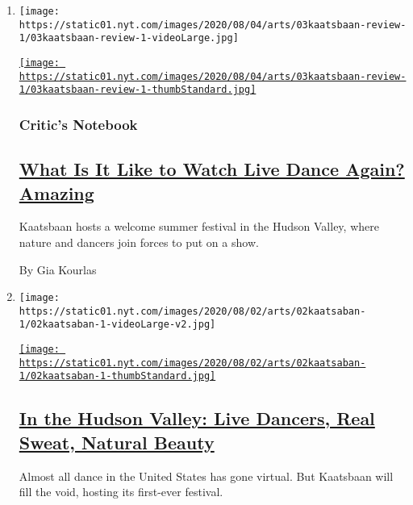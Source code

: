 \begin{enumerate}
\def\labelenumi{\arabic{enumi}.}
\item
  \texttt{[image: https://static01.nyt.com/images/2020/08/04/arts/03kaatsbaan-review-1/03kaatsbaan-review-1-videoLarge.jpg]}

  \href{/2020/08/03/arts/dance/kaatsbaan-dance.html}{\texttt{[image: https://static01.nyt.com/images/2020/08/04/arts/03kaatsbaan-review-1/03kaatsbaan-review-1-thumbStandard.jpg]}}

  \hypertarget{critics-notebook}{%
  \subsubsection{Critic's Notebook}\label{critics-notebook}}

  \hypertarget{what-is-it-like-to-watch-live-dance-again-amazing}{%
  \subsection{\texorpdfstring{\href{/2020/08/03/arts/dance/kaatsbaan-dance.html}{What
  Is It Like to Watch Live Dance Again?
  Amazing}}{What Is It Like to Watch Live Dance Again? Amazing}}\label{what-is-it-like-to-watch-live-dance-again-amazing}}

  Kaatsbaan hosts a welcome summer festival in the Hudson Valley, where
  nature and dancers join forces to put on a show.

  By Gia Kourlas
\item
  \texttt{[image: https://static01.nyt.com/images/2020/08/02/arts/02kaatsaban-1/02kaatsaban-1-videoLarge-v2.jpg]}

  \href{/2020/07/29/arts/dance/kaatsbaan-dance-festival-stella-abrera.html}{\texttt{[image: https://static01.nyt.com/images/2020/08/02/arts/02kaatsaban-1/02kaatsaban-1-thumbStandard.jpg]}}

  \hypertarget{in-the-hudson-valley-live-dancers-real-sweat-natural-beauty}{%
  \subsection{\texorpdfstring{\href{/2020/07/29/arts/dance/kaatsbaan-dance-festival-stella-abrera.html}{In
  the Hudson Valley: Live Dancers, Real Sweat, Natural
  Beauty}}{In the Hudson Valley: Live Dancers, Real Sweat, Natural Beauty}}\label{in-the-hudson-valley-live-dancers-real-sweat-natural-beauty}}

  Almost all dance in the United States has gone virtual. But Kaatsbaan
  will fill the void, hosting its first-ever festival.


\end{enumerate}
